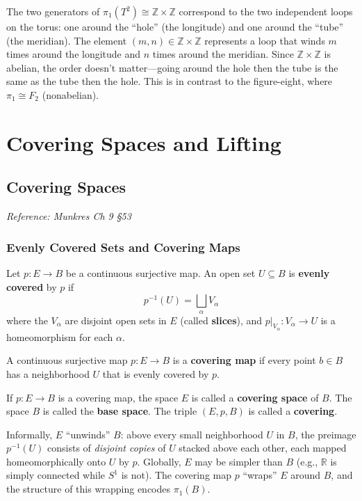 \documentclass[11pt]{report}
\begin{document}
\begin{rembox}
The two generators of $\pi_1(T^2) \cong \mathbb{Z} \times \mathbb{Z}$ correspond to the two independent loops on the torus: one around the ``hole'' (the longitude) and one around the ``tube'' (the meridian). The element $(m, n) \in \mathbb{Z} \times \mathbb{Z}$ represents a loop that winds $m$ times around the longitude and $n$ times around the meridian. Since $\mathbb{Z} \times \mathbb{Z}$ is abelian, the order doesn't matter---going around the hole then the tube is the same as the tube then the hole. This is in contrast to the figure-eight, where $\pi_1 \cong F_2$ (nonabelian).
\end{rembox}

\chapter{Covering Spaces and Lifting}

\section{Covering Spaces}

\textit{Reference: Munkres Ch 9 \S 53}

\subsection{Evenly Covered Sets and Covering Maps}

\begin{defbox}
Let $p: E \to B$ be a continuous surjective map. An open set $U \subseteq B$ is \textbf{evenly covered} by $p$ if
\[p^{-1}(U) = \bigsqcup_\alpha V_\alpha\]
where the $V_\alpha$ are disjoint open sets in $E$ (called \textbf{slices}), and $p|_{V_\alpha}: V_\alpha \to U$ is a homeomorphism for each $\alpha$.
\end{defbox}

\begin{defbox}
A continuous surjective map $p: E \to B$ is a \textbf{covering map} if every point $b \in B$ has a neighborhood $U$ that is evenly covered by $p$.
\end{defbox}

\begin{defbox}
If $p: E \to B$ is a covering map, the space $E$ is called a \textbf{covering space} of $B$. The space $B$ is called the \textbf{base space}. The triple $(E, p, B)$ is called a \textbf{covering}.

Informally, $E$ ``unwinds'' $B$: above every small neighborhood $U$ in $B$, the preimage $p^{-1}(U)$ consists of \emph{disjoint copies} of $U$ stacked above each other, each mapped homeomorphically onto $U$ by $p$. Globally, $E$ may be simpler than $B$ (e.g., $\mathbb{R}$ is simply connected while $S^1$ is not). The covering map $p$ ``wraps'' $E$ around $B$, and the structure of this wrapping encodes $\pi_1(B)$.
\end{defbox}
\end{document}
